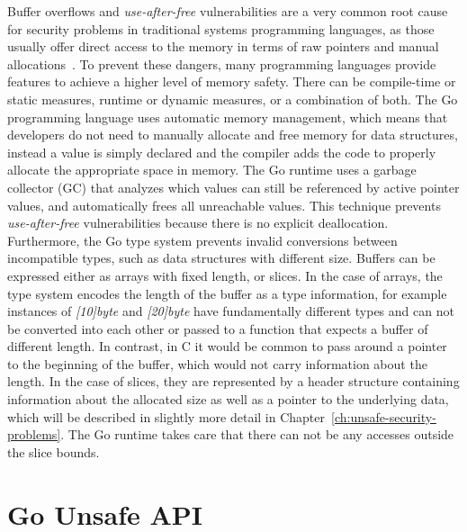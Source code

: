 Buffer overflows and \textit{use-after-free} vulnerabilities are a very common root cause for security problems in
traditional systems programming languages, as those usually offer direct access to the memory in terms of raw pointers
and manual allocations~\cite{larochelle2001}.
To prevent these dangers, many programming languages provide features to achieve a higher level of memory safety.
There can be compile-time or static measures, runtime or dynamic measures, or a combination of both.
The Go programming language uses automatic memory management, which means that developers do not need to manually
allocate and free memory for data structures, instead a value is simply declared and the compiler adds the code to
properly allocate the appropriate space in memory.
The Go runtime uses a garbage collector (\acrshort{GC}) that analyzes which values can still be referenced by active
pointer values, and automatically frees all unreachable values.
This technique prevents \textit{use-after-free} vulnerabilities because there is no explicit deallocation.
Furthermore, the Go type system prevents invalid conversions between incompatible types, such as data structures with
different size.
Buffers can be expressed either as arrays with fixed length, or slices.
In the case of arrays, the type system encodes the length of the buffer as a type information, for example instances
of \textit{[10]byte} and \textit{[20]byte} have fundamentally different types and can not be converted into each other
or passed to a function that expects a buffer of different length.
In contrast, in C it would be common to pass around a pointer to the beginning of the buffer, which would not carry
information about the length.
In the case of slices, they are represented by a header structure containing information about the allocated size as
well as a pointer to the underlying data, which will be described in slightly more detail in
Chapter~\ref{ch:unsafe-security-problems}.
The Go runtime takes care that there can not be any accesses outside the slice bounds.



\section{Go Unsafe API}\label{sec:background:unsafe-api}

